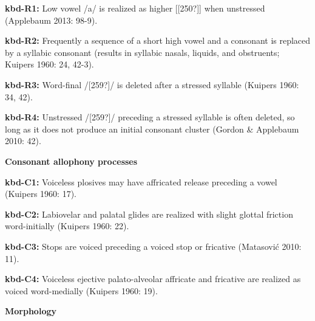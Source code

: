 \begin{styleBody}
\textbf{kbd-R1:} Low vowel /a/ is realized as higher [[250?]] when unstressed (Applebaum 2013: 98-9).
\end{styleBody}

\begin{styleBody}
\textbf{kbd-R2:} Frequently a sequence of a short high vowel and a consonant is replaced by a syllabic consonant (results in syllabic nasals, liquids, and obstruents; Kuipers 1960: 24, 42-3).
\end{styleBody}

\begin{styleBody}
\textbf{kbd-R3:} Word-final /[259?]/ is deleted after a stressed syllable (Kuipers 1960: 34, 42).
\end{styleBody}

\begin{styleBody}
\textbf{kbd-R4: }Unstressed /[259?]/ preceding a stressed syllable is often deleted, so long as it does not produce an initial consonant cluster (Gordon \& Applebaum 2010: 42).
\end{styleBody}

\begin{styleBody}
\textbf{Consonant allophony processes}
\end{styleBody}

\begin{styleBody}
\textbf{kbd-C1: }Voiceless plosives may have affricated release preceding a vowel (Kuipers 1960: 17).
\end{styleBody}

\begin{styleBody}
\textbf{kbd-C2: }Labiovelar and palatal glides are realized with slight glottal friction word-initially (Kuipers 1960: 22).
\end{styleBody}

\begin{styleBody}
\textbf{kbd-C3: }Stops are voiced preceding a voiced stop or fricative (Matasović 2010: 11).
\end{styleBody}

\begin{styleBody}
\textbf{kbd-C4: }Voiceless ejective palato-alveolar affricate and fricative are realized as voiced word-medially (Kuipers 1960: 19).
\end{styleBody}

\begin{styleBody}
\textbf{Morphology}
\end{styleBody}

